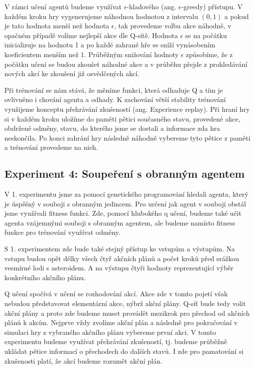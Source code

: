 V rámci učení agentů budeme využívat $\epsilon$-hladového (ang. $\epsilon$-greedy) přístupu.
V každém kroku hry vygenerujeme náhodnou hodnotou z intervalu $(0,1)$ a pokud je tato hodnota menší než hodnota $\epsilon$, tak provedeme volbu akce náhodně, v opačném případě volíme nejlepší akce dle Q-sítě.
Hodnota $\epsilon$ se na počátku inicializuje na hodnotu 1 a po každé zahrané hře se sníží vynásobením koeficientem menším než 1. 
Průběžným snižování hodnoty $\epsilon$ způsobíme, že z počátku učení se budou zkoušet náhodné akce a v průběhu přejde z prohledávání nových akcí ke zkoušení již osvědčených akcí.


\par
Při trénování se nám stává, že měníme funkci, která odhaduje Q a tím je ovlivněno i chování agenta a odhady. K zachování větší stability trénování využijeme konceptu přehrávání zkušeností (ang. Experience replay).
Při hraní hry si v každém kroku uložíme do paměti pětici současného stavu, provedené akce, obdržené odměny, stavu, do kterého jsme se dostali a informace zda hra neskončila.
Po konci zahrání hry následně náhodně vybereme tyto pětice z paměti a trénování provedeme na nich.


\newpage
\subsection{Experiment 4: Soupeření s obranným agentem}
V 1. experimentu jsme za pomocí genetického programování hledali agenta, který je úspěšný v souboji s obranným jedincem. Pro určení jak agent v souboji obstál jsme využívali fitness funkci.
Zde, pomocí hlubokého q učení, budeme také učit agenta vzájemnými souboji s obranným agentem, ale budeme namísto fitness funkce pro trénování využívat odměny.

S 1. experimentem zde bude také stejný přístup ke vstupům a výstupům. 
Na vstupu budou opět délky všech čtyř akčních plánů a počet kroků před srážkou vesmírné lodi s asteroidem.
A na výstupu čtyři hodnoty reprezentující výběr konkrétního akčního plánu.

Q učení spočívá v učení se rozhodování akcí. Akce zde v tomto pojetí však nebudou představovat elementární akce, nýbrž akční plány. 
Q-síť bude tedy volit akční plány a proto zde budeme muset provádět mezikrok pro přechod od akčních plánů k akcím.
Nejprve vždy zvolíme akční plán a následně pro pokračování v simulaci hry z vybraného akčního plánu vybereme první akci.
V tomto experimentu budeme využívat přehrávání zkušeností, tj. budeme průběžně ukládat pětice informací o přechodech do dalších stavů. 
I zde pro pamatování si zkušenosti platí, že akcí budeme rozumět akční plán.


